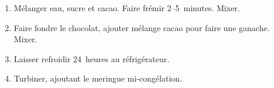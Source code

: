 
\begin{ingredients}
\end{ingredients}

\begin{recipe}
  \begin{enumerate}

  \item Mélanger eau, sucre et cacao.  Faire frémir 2--5~minutes.
    Mixer.

  \item Faire fondre le chocolat, ajouter mélange cacao pour faire une
    ganache.  Mixer.

  \item Laisser refroidir 24~heures au réfrigérateur.

  \item Turbiner, ajoutant le meringue mi-congélation.

  \end{enumerate}
\end{recipe}


